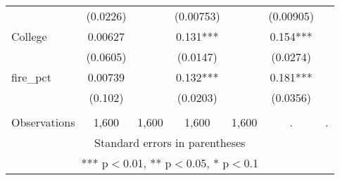 \begin{tabular}{lcccccc}
 & (0.0226) &  & (0.00753) &  & (0.00905) &  \\
College & 0.00627 &  & 0.131*** &  & 0.154*** &  \\
 & (0.0605) &  & (0.0147) &  & (0.0274) &  \\
fire\_pct & 0.00739 &  & 0.132*** &  & 0.181*** &  \\
 & (0.102) &  & (0.0203) &  & (0.0356) &  \\
 &  &  &  &  &  &  \\
 Observations & 1,600 & 1,600 & 1,600 & 1,600 & . & . \\ \hline
\multicolumn{7}{c}{ Standard errors in parentheses} \\
\multicolumn{7}{c}{ *** p$<$0.01, ** p$<$0.05, * p$<$0.1} \\
\end{tabular}
